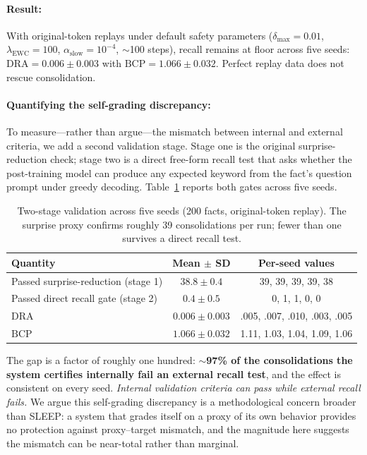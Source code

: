 \paragraph{Result:} With original-token replays under default safety parameters ($\delta_{\max}=0.01$, $\lambda_{\mathrm{EWC}}=100$, $\alpha_{\mathrm{slow}}=10^{-4}$, $\sim$100 steps), recall remains at floor across five seeds: $\mathrm{DRA} = 0.006 \pm 0.003$ with $\mathrm{BCP} = 1.066 \pm 0.032$. Perfect replay data does not rescue consolidation.

\paragraph{Quantifying the self-grading discrepancy:} To measure---rather than argue---the mismatch between internal and external criteria, we add a second validation stage. Stage one is the original surprise-reduction check; stage two is a direct free-form recall test that asks whether the post-training model can produce any expected keyword from the fact's question prompt under greedy decoding. Table~\ref{tab:two_stage} reports both gates across five seeds.

\begin{table}[t]
\centering
\caption{Two-stage validation across five seeds (200 facts, original-token replay). The surprise proxy confirms roughly 39 consolidations per run; fewer than one survives a direct recall test.}
\label{tab:two_stage}
\begin{tabular}{lcc}
\toprule
Quantity & Mean $\pm$ SD & Per-seed values \\
\midrule
Passed surprise-reduction (stage 1) & $38.8 \pm 0.4$ & 39, 39, 39, 39, 38 \\
Passed direct recall gate (stage 2) & $0.4 \pm 0.5$ & 0, 1, 1, 0, 0 \\
$\mathrm{DRA}$ & $0.006 \pm 0.003$ & .005, .007, .010, .003, .005 \\
$\mathrm{BCP}$ & $1.066 \pm 0.032$ & 1.11, 1.03, 1.04, 1.09, 1.06 \\
\bottomrule
\end{tabular}
\end{table}

The gap is a factor of roughly one hundred: \textbf{$\sim$97\% of the consolidations the system certifies internally fail an external recall test}, and the effect is consistent on every seed. \emph{Internal validation criteria can pass while external recall fails.} We argue this self-grading discrepancy is a methodological concern broader than SLEEP: a system that grades itself on a proxy of its own behavior provides no protection against proxy--target mismatch, and the magnitude here suggests the mismatch can be near-total rather than marginal.

